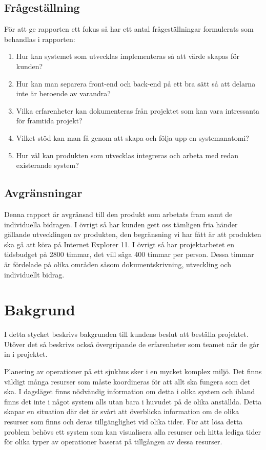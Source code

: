 \documentclass[a4paper,10pt]{article}
\begin{document}
\subsection{Frågeställning}
För att ge rapporten ett fokus så har ett antal frågeställningar formulerats som behandlas i rapporten:
\begin{enumerate}
	\item Hur kan systemet som utvecklas implementeras så att värde skapas för kunden?
	\item Hur kan man separera front-end och back-end på ett bra sätt så att delarna inte är beroende av varandra?
	\item Vilka erfarenheter kan dokumenteras från projektet som kan vara intressanta för framtida projekt?
	\item Vilket stöd kan man få genom att skapa och följa upp en systemanatomi?
	\item Hur väl kan produkten som utvecklas integreras och arbeta med redan existerande system?
\end{enumerate}

\subsection{Avgränsningar}
Denna rapport är avgränsad till den produkt som arbetats fram samt de individuella bidragen. I övrigt så har kunden gett oss tämligen fria händer gällande utvecklingen av produkten, den begränsning vi har fått är att produkten ska gå att köra på Internet Explorer 11.
I övrigt så har projektarbetet en tidsbudget på 2800 timmar, det vill säga 400 timmar per person. Dessa timmar är fördelade på olika områden såsom dokumentskrivning, utveckling och individuellt bidrag.

\newpage

\section{Bakgrund}
I detta stycket beskrivs bakgrunden till kundens beslut att beställa projektet. Utöver det så beskrivs också övergripande de erfarenheter som teamet när de går in i projektet.

Planering av operationer på ett sjukhus sker i en mycket komplex miljö. Det finns väldigt många resurser som måste koordineras för att allt ska fungera som det ska.
I dagsläget finns nödvändig information om detta i olika system och ibland finns det inte i något system alls utan bara i huvudet på de olika anställda. Detta skapar en situation där det är svårt att överblicka information om de olika resurser som finns och deras tillgänglighet vid olika tider.
För att lösa detta problem behövs ett system som kan visualisera alla resurser och hitta lediga tider för olika typer av operationer baserat på tillgången av dessa resurser.
\end{document}
